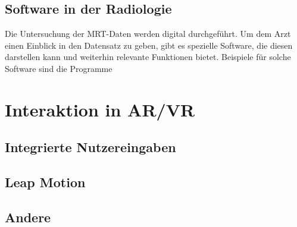 \subsection{Software in der Radiologie}
Die Untersuchung der MRT-Daten werden digital durchgeführt. Um dem Arzt einen Einblick in den Datensatz zu geben, gibt es spezielle Software, die diesen darstellen kann und weiterhin relevante Funktionen bietet. Beispiele für solche Software sind die Programme


\section{Interaktion in AR/VR}								 %
\subsection{Integrierte Nutzereingaben}
\subsection{Leap Motion}
\subsection{Andere}







